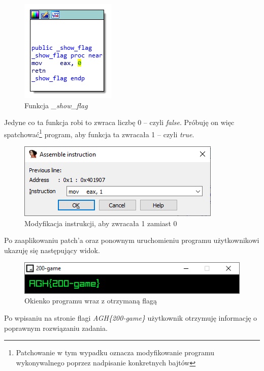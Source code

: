 \documentclass[polish,12pt]{aghthesis}
\begin{document}
\begin{figure}[H]
    \centering
    \includegraphics{200_ida_show_flag}
    \caption{Funkcja \emph{\_show\_flag}}
    \label{fig:200_ida_show_flag}
\end{figure}

Jedyne co ta funkcja robi to zwraca liczbę 0 -- czyli \emph{false}.
Próbuję on więc spatchować\footnote{Patchowanie w tym wypadku oznacza modyfikowanie programu
wykonywalnego poprzez nadpisanie konkretnych bajtów}
program, aby funkcja ta zwracała 1 -- czyli \emph{true}.

\begin{figure}[H]
    \centering
    \includegraphics{200_ida_patch}
    \caption{Modyfikacja instrukcji, aby zwracała 1 zamiast 0}
    \label{fig:200_ida_patch}
\end{figure}

Po zaaplikowaniu patch'a oraz ponownym uruchomieniu programu użytkownikowi ukazuję się
następujący widok.

\begin{figure}[H]
    \centering
    \includegraphics{200_flag}
    \caption{Okienko programu wraz z otrzymaną flagą}
    \label{fig:200_flag}
\end{figure}

Po wpisaniu na stronie flagi \emph{AGH\{200-game\}} użytkownik otrzymuję informację
o poprawnym rozwiązaniu zadania.

\clearpage
\end{document}
